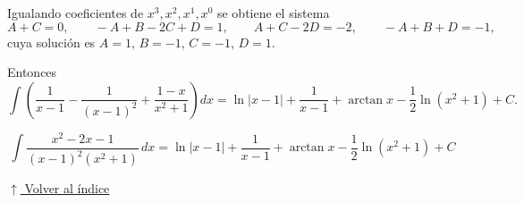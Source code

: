 \documentclass[12pt]{article}
\newcommand{\volverindice}{%
    \vspace{1em}%
    \begin{flushright}%
        \hyperlink{indice}{\small $\uparrow$ Volver al índice}%
    \end{flushright}%
}
\begin{document}
\begin{enumerate}[label=\alph*.-]
    Igualando coeficientes de $x^3,x^2,x^1,x^0$ se obtiene el sistema
    \[
    A+C=0,\qquad -A+B-2C+D=1,\qquad A+C-2D=-2,\qquad -A+B+D=-1,
    \]
    cuya solución es $A=1$, $B=-1$, $C=-1$, $D=1$.

    Entonces
    \[
    \int\left(\frac{1}{x-1}-\frac{1}{(x-1)^2}+\frac{1-x}{x^2+1}\right)dx
    =\ln|x-1|+\frac{1}{x-1}+\arctan x-\frac12\ln(x^2+1)+C.
    \]

    \[
    \boxed{
    \int\frac{x^2-2x-1}{(x-1)^2(x^2+1)}\,dx
    =\ln|x-1|+\frac{1}{x-1}+\arctan x-\frac12\ln(x^2+1)+C
    }
    \]

\end{enumerate}

\volverindice
\newpage
\end{document}
